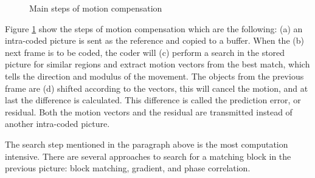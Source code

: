 \documentclass[a4paper, 12pt]{article}
\begin{document}
\begin{figure}[h]
\caption{Main steps of motion compensation}
\label{fig:motion}
\end{figure}

	Figure \ref{fig:motion} show the steps of motion compensation which are the following: (a) an intra-coded picture is sent as the reference and copied to a buffer. When the (b) next frame is to be coded, the coder will (c) perform a search in the stored picture for similar regions and extract motion vectors from the best match, which tells the direction and modulus of the movement. The objects from the previous frame are (d) shifted according to the vectors, this will cancel the motion, and at last the difference is calculated. This difference is called the prediction error, or residual. Both the motion vectors and the residual are transmitted instead of another intra-coded picture.

	The search step mentioned in the paragraph above is the most computation intensive. There are several approaches to search for a matching block in the previous picture: block matching, gradient, and phase correlation.
\end{document}
